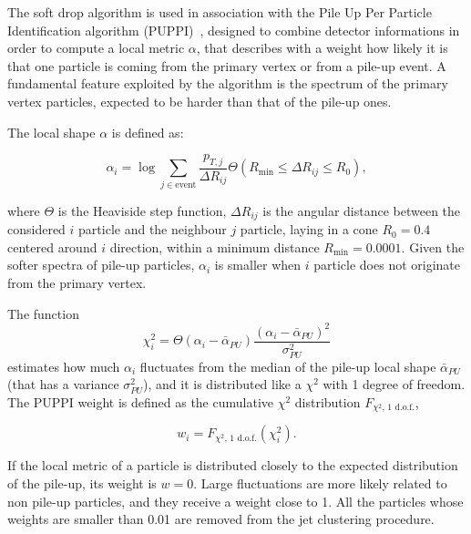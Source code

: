 \vspace*{1\baselineskip}

\noindent The soft drop algorithm is used in association with the Pile Up Per Particle Identification algorithm (PUPPI)~\cite{Bertolini2014}, designed to combine detector informations in order to compute a local metric $\alpha$, that describes with a weight how likely it is that one particle is coming from the primary vertex or from a pile-up event. A fundamental feature exploited by the algorithm is the \pt spectrum of the primary vertex particles, expected to be harder than that of the pile-up ones.

\noindent The local shape $\alpha$ is defined as:

\begin{equation}
\alpha_i = \log{ \sum_{j \in \text{event}} \frac{p_{T,j}}{\Delta R_{ij}} \Theta \left( R_{\text{min}} \leq \Delta R_{ij} \leq R_0 \right)},
\label{eq:puppi_shape_def}
\end{equation}

\noindent where $\Theta$ is the Heaviside step function, $\Delta R_{ij}$ is the angular distance between the considered $i$ particle and the neighbour $j$ particle, laying  in a cone $R_0 = 0.4$ centered around $i$ direction, within a minimum distance $R_{\text{min}} = 0.0001$. Given the softer \pt spectra of pile-up particles, $\alpha_i$ is smaller when $i$ particle does not originate from the primary vertex.

\noindent The function
\begin{equation}
\chi_i^2 = \Theta (\alpha_i - \bar{\alpha}_{PU}) \frac{\left(  \alpha_i -  \bar{\alpha}_{PU}  \right)^2}{\sigma^2_{PU}}
\label{eq:puppi_chi2}
\end{equation}
\noindent estimates how much $\alpha_i$ fluctuates from the median of the pile-up local shape $\bar{\alpha}_{PU}$ (that has a variance $\sigma^2_{PU}$), and it is distributed like a $\chi^2$ with 1 degree of freedom. The PUPPI weight is defined as the cumulative $\chi^2$ distribution $F_{\chi^2\text{, 1 d.o.f.}}$,

\begin{equation}
w_i = F_{\chi^2\text{, 1 d.o.f.}} (\chi_i^2).
\label{eq:puppi_weight}
\end{equation}

\noindent If the local metric of a particle is distributed closely to the expected distribution of the pile-up, its weight is $w=0$. Large fluctuations are more likely related to non pile-up particles, and they receive a weight close to 1.  All the particles whose weights are smaller than 0.01 are removed from the jet clustering procedure.

